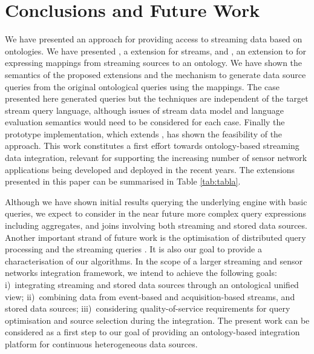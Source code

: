 \section{Conclusions and Future Work}
\label{conclusions}

We have presented an approach for providing access to streaming data based on ontologies.
We have presented \sparqlstr, a \sparql extension for \rdf streams, and \stwoo, an extension to \rtwoo for expressing mappings from streaming sources to an ontology.
We have shown the semantics of the proposed extensions and the mechanism to generate data source queries from the original ontological queries using the mappings.
The case presented here generated \sneeql queries but the techniques are independent of the target stream query language, although issues of stream data model and language evaluation semantics would need to be considered for each case.
Finally the prototype implementation, which extends \odemapster, has shown the feasibility of the approach.
This work constitutes a first effort towards ontology-based streaming data integration, relevant for supporting the increasing number of sensor network applications being developed and deployed in the recent years. 
The extensions presented in this paper can be summarised in Table \ref{tab:tabla}.


Although we have shown initial results querying the underlying \snee engine with basic queries, we expect to consider in the near future more complex query expressions including aggregates, and joins involving both streaming and stored data sources.
Another important strand of future work is the optimisation of distributed query processing \cite{Kossmann_00} and the streaming queries \cite{Abadi_2005,Galpin_09}.
It is also our goal to provide a characterisation of our algorithms. 
In the scope of a larger streaming and sensor networks integration framework, we intend to achieve the following goals: %
i)~integrating streaming and stored data sources through an ontological unified view; %
ii)~combining data from event-based and acquisition-based streams, and stored data sources; %
iii)~considering quality-of-service requirements for query optimisation and source selection during the integration.
The present work can be considered as a first step to our goal of providing an ontology-based integration platform for continuous heterogeneous data sources. 

